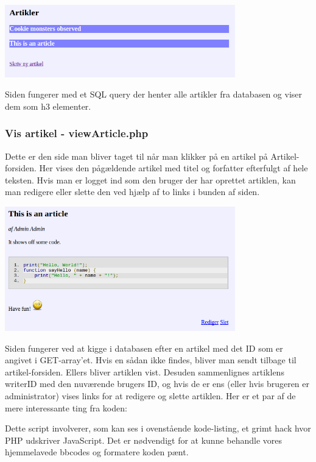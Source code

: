 \documentclass{article}
\begin{document}
\includegraphics[width=100mm]{mi05.png}

Siden fungerer med et SQL query der henter alle artikler fra databasen og viser dem som h3 elementer.



\subsubsection[Vis artikel]{Vis artikel - viewArticle.php}
Dette er den side man bliver taget til når man klikker på en artikel på Artikel-forsiden. Her vises den pågældende artikel med titel og forfatter efterfulgt af hele teksten. Hvis man er logget ind som den bruger der har oprettet artiklen, kan man redigere eller slette den ved hjælp af to links i bunden af siden.

\includegraphics[width=100mm]{mi10.png}

Siden fungerer ved at kigge i databasen efter en artikel med det ID som er angivet i GET-array'et. Hvis en sådan ikke findes, bliver man sendt tilbage til artikel-forsiden. Ellers bliver artiklen vist. Desuden sammenlignes artiklens writerID med den nuværende brugers ID, og hvis de er ens (eller hvis brugeren er administrator) vises links for at redigere og slette artiklen. Her er et par af de mere interessante ting fra koden:



Dette script involverer, som kan ses i ovenstående kode-listing, et grimt hack hvor PHP udskriver JavaScript. Det er nødvendigt for at kunne behandle vores hjemmelavede bbcodes og formatere koden pænt.
\end{document}
